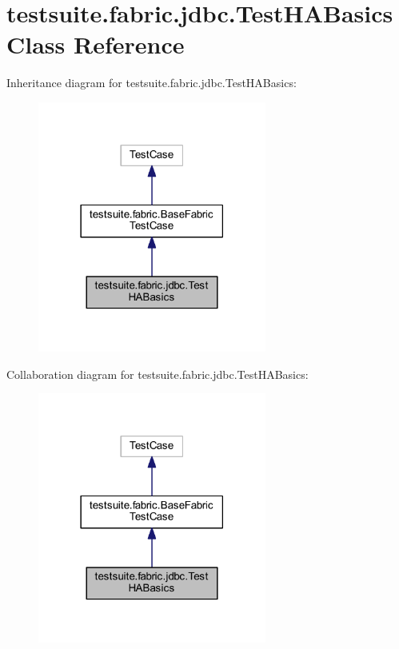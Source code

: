 \hypertarget{classtestsuite_1_1fabric_1_1jdbc_1_1_test_h_a_basics}{}\section{testsuite.\+fabric.\+jdbc.\+Test\+H\+A\+Basics Class Reference}
\label{classtestsuite_1_1fabric_1_1jdbc_1_1_test_h_a_basics}


Inheritance diagram for testsuite.\+fabric.\+jdbc.\+Test\+H\+A\+Basics\+:
\nopagebreak
\begin{figure}[H]
\begin{center}
\leavevmode
\includegraphics[width=213pt]{classtestsuite_1_1fabric_1_1jdbc_1_1_test_h_a_basics__inherit__graph}
\end{center}
\end{figure}


Collaboration diagram for testsuite.\+fabric.\+jdbc.\+Test\+H\+A\+Basics\+:
\nopagebreak
\begin{figure}[H]
\begin{center}
\leavevmode
\includegraphics[width=213pt]{classtestsuite_1_1fabric_1_1jdbc_1_1_test_h_a_basics__coll__graph}
\end{center}
\end{figure}
